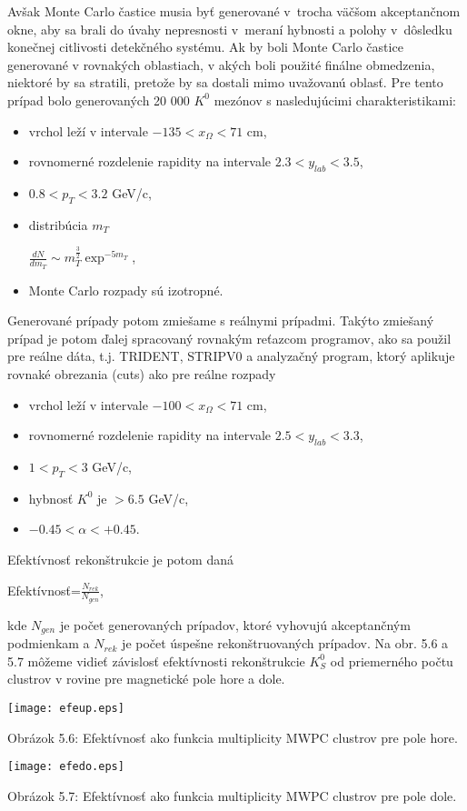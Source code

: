 Avšak Monte Carlo častice musia byť generované v~trocha väčšom
akceptančnom okne, aby sa brali do úvahy nepresnosti v~meraní hybnosti a
polohy v~dôsledku konečnej citlivosti detekčného systému. Ak by boli Monte
Carlo častice generované v rovnakých oblastiach, v akých boli použité
finálne obmedzenia, niektoré by sa stratili, pretože by sa dostali mimo
uvažovanú oblasť. Pre tento prípad bolo generovaných 20 000 $K^{0}$  mezónov
s nasledujúcimi charakteristikami:
\begin{itemize}
 \item vrchol leží v intervale $-135<x_{\Omega}<71$ cm,
 \item rovnomerné rozdelenie rapidity na intervale $2.3<y_{lab}<3.5$,
 \item $0.8<p_{T}<3.2$ GeV/c,
 \item distribúcia $m_{T}$
\begin{center}
$\frac{dN}{dm_{T}} \sim m_{T}^{\frac{3}{2}}\exp^{-5 m_{T}}$,
\end{center}
 \item Monte Carlo rozpady sú izotropné.

\end{itemize}
Generované prípady potom zmiešame s reálnymi prípadmi. Takýto zmiešaný
prípad je potom ďalej spracovaný rovnakým reťazcom programov, ako sa
použil pre reálne dáta, t.j. TRIDENT, STRIPV0 a analyzačný program, ktorý
aplikuje rovnaké obrezania (cuts) ako pre reálne rozpady
\begin{itemize}
  \item vrchol leží v intervale $-100<x_{\Omega}<71$ cm,
  \item rovnomerné rozdelenie rapidity na intervale $2.5<y_{lab}<3.3$,
  \item $1<p_{T}<3$ GeV/c,
  \item hybnosť $K^{0}$ je $>6.5$ GeV/c,
  \item $-0.45<\alpha<+0.45$.
\end{itemize}
Efektívnosť rekonštrukcie je potom daná 
\begin{center}
  Efektívnosť=$\frac{N_{rek}}{N_{gen}}$,
\end{center}
kde $N_{gen}$ je počet generovaných prípadov, ktoré vyhovujú akceptančným
podmienkam a $N_{rek}$ je počet úspešne rekonštruovaných prípadov.
Na obr. 5.6 a 5.7 môžeme vidieť závislosť efektívnosti rekonštrukcie
$K^{0}_{S}$ od priemerného počtu clustrov v rovine pre magnetické pole hore a
dole.

\newpage
\begin{center}
  \texttt{[image: efeup.eps]}
\end{center}
\begin{center}
  Obrázok 5.6: Efektívnosť ako funkcia multiplicity MWPC
clustrov pre pole hore.
\end{center}

\begin{center}
  \texttt{[image: efedo.eps]}
\end{center}
\begin{center}
  Obrázok 5.7: Efektívnosť ako funkcia multiplicity MWPC
clustrov pre pole dole.
\end{center}




%
